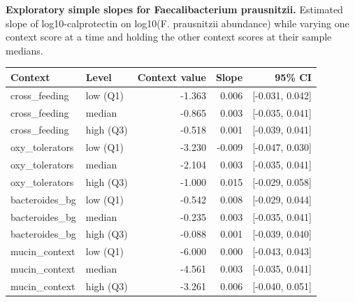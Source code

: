 \noindent\textbf{Exploratory simple slopes for Faecalibacterium prausnitzii.} Estimated slope of log10-calprotectin on log10(F. prausnitzii abundance) while varying one context score at a time and holding the other context scores at their sample medians.

\begin{center}
\scriptsize
\begin{tabularx}{\textwidth}{@{} l l r r r @{}}
\toprule
Context & Level & Context value & Slope & 95\% CI \\
\midrule
cross\_feeding & low (Q1) & -1.363 & 0.006 & [-0.031, 0.042] \\
cross\_feeding & median & -0.865 & 0.003 & [-0.035, 0.041] \\
cross\_feeding & high (Q3) & -0.518 & 0.001 & [-0.039, 0.041] \\
oxy\_tolerators & low (Q1) & -3.230 & -0.009 & [-0.047, 0.030] \\
oxy\_tolerators & median & -2.104 & 0.003 & [-0.035, 0.041] \\
oxy\_tolerators & high (Q3) & -1.000 & 0.015 & [-0.029, 0.058] \\
bacteroides\_bg & low (Q1) & -0.542 & 0.008 & [-0.029, 0.044] \\
bacteroides\_bg & median & -0.235 & 0.003 & [-0.035, 0.041] \\
bacteroides\_bg & high (Q3) & -0.088 & 0.001 & [-0.039, 0.040] \\
mucin\_context & low (Q1) & -6.000 & 0.000 & [-0.043, 0.043] \\
mucin\_context & median & -4.561 & 0.003 & [-0.035, 0.041] \\
mucin\_context & high (Q3) & -3.261 & 0.006 & [-0.040, 0.051] \\
\bottomrule
\end{tabularx}
\end{center}

